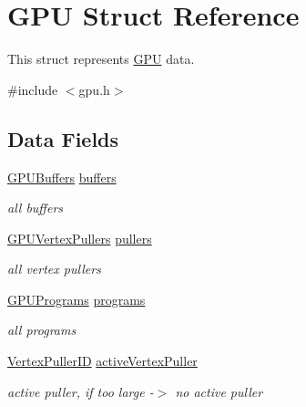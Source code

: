 \hypertarget{structGPU}{}\section{G\+PU Struct Reference}
\label{structGPU}


This struct represents \hyperlink{structGPU}{G\+PU} data.  




{\ttfamily \#include $<$gpu.\+h$>$}

\subsection*{Data Fields}
\begin{DoxyCompactItemize}
\item 
\mbox{\label{structGPU_a5331efee19e47626495c99b1869d6b31}} 
\hyperlink{structGPUBuffers}{G\+P\+U\+Buffers} \hyperlink{structGPU_a5331efee19e47626495c99b1869d6b31}{buffers}
\begin{DoxyCompactList}\small\item\em all buffers \end{DoxyCompactList}\item 
\mbox{\label{structGPU_a1463956b595e58bdbc5221d995173fd6}} 
\hyperlink{structGPUVertexPullers}{G\+P\+U\+Vertex\+Pullers} \hyperlink{structGPU_a1463956b595e58bdbc5221d995173fd6}{pullers}
\begin{DoxyCompactList}\small\item\em all vertex pullers \end{DoxyCompactList}\item 
\mbox{\label{structGPU_a78eb40077ccd6d3c43805961cfb69917}} 
\hyperlink{structGPUPrograms}{G\+P\+U\+Programs} \hyperlink{structGPU_a78eb40077ccd6d3c43805961cfb69917}{programs}
\begin{DoxyCompactList}\small\item\em all programs \end{DoxyCompactList}\item 
\mbox{\label{structGPU_a14a6f83ca1cc1dd10c28e15ad823cb53}} 
\hyperlink{student_2fwd_8h_a23828e2281a794e193ebaf0df3e1f17c}{Vertex\+Puller\+ID} \hyperlink{structGPU_a14a6f83ca1cc1dd10c28e15ad823cb53}{active\+Vertex\+Puller}
\begin{DoxyCompactList}\small\item\em active puller, if too large -\/$>$ no active puller \end{DoxyCompactList}\item 

\end{DoxyCompactItemize}
